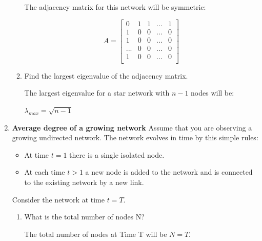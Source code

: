 \documentclass{amsart}
\theoremstyle{definition}
\theoremstyle{remark}
\numberwithin{equation}{section}
\begin{document}
\begin{enumerate}
\begin{enumerate}
The adjacency matrix for this network will be symmetric:

\begin{equation*}
    {A}  = \left\lbrack\begin{array}{ccccc}
    0 & 1 & 1 & ... & 1 \\
    1 & 0 & 0 & ... & 0 \\
    1 & 0 & 0 & ... & 0 \\
    ... & 0 & 0 & ... & 0 \\
    1 & 0 & 0 & ... & 0 \\
    \end{array}\right\rbrack
\end{equation*}

\vspace{0.2cm}

\item Find the largest eigenvalue of the adjacency matrix. 
\vspace{0.2cm}

The largest eigenvalue for a star network with $n-1$ nodes will be:
\vspace{0.2cm}

$\lambda_{max} = \sqrt{n-1}$

\vspace{0.2cm}
\end{enumerate}

\clearpage
\item {\bf Average degree of a growing network} Assume that you are observing a growing undirected network.
The network evolves in time by this simple rules:
\begin{itemize}
\item At time $t = 1$ there is a single isolated node.
\item At each time $t > 1$ a new node is added to the network and is connected
to the existing network by a new link.
\end{itemize}
Consider the network at time $t = T$.
\begin{enumerate}
\item What is the total number of nodes N? \vspace{0.2cm}

The total number of nodes at Time T will be $N = T$.


\end{enumerate}
\end{enumerate}
\end{document}
